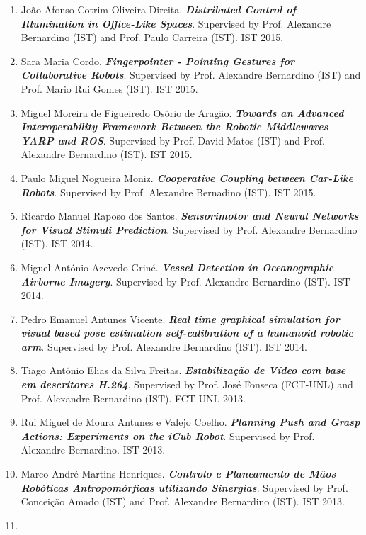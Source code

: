 \documentclass[
]{article}
\begin{document}
\begin{enumerate}
{{  Detection with Multichannel Convolutional Neural Networks}}.
  Supervised by Prof. Jacinto Nascimento (IST) and Prof. Alexandre
  Bernardino (IST). IST 2015.
\item
  João Afonso Cotrim Oliveira Direita. \emph{\textbf{Distributed Control
  of Illumination in Office-Like Spaces}}. Supervised by Prof. Alexandre
  Bernardino (IST) and Prof. Paulo Carreira (IST). IST 2015.
\item
  Sara Maria Cordo. \emph{\textbf{Fingerpointer - Pointing Gestures for
  Collaborative Robots}}. Supervised by Prof. Alexandre Bernardino (IST)
  and Prof. Mario Rui Gomes (IST). IST 2015.
\item
  Miguel Moreira de Figueiredo Osório de Aragão. \emph{\textbf{Towards
  an Advanced Interoperability Framework Between the Robotic Middlewares
  YARP and ROS}}. Supervised by Prof. David Matos (IST) and Prof.
  Alexandre Bernardino (IST). IST 2015.
\item
  Paulo Miguel Nogueira Moniz. \emph{\textbf{Cooperative Coupling
  between Car-Like Robots}}. Supervised by Prof. Alexandre Bernadino
  (IST). IST 2015.
\item
  Ricardo Manuel Raposo dos Santos. \emph{\textbf{Sensorimotor and
  Neural Networks for Visual Stimuli Prediction}}. Supervised by Prof.
  Alexandre Bernardino (IST). IST 2014.
\item
  Miguel António Azevedo Griné. \emph{\textbf{Vessel Detection in
  Oceanographic Airborne Imagery}}. Supervised by Prof. Alexandre
  Bernardino (IST). IST 2014.
\item
  Pedro Emanuel Antunes Vicente. \emph{\textbf{Real time graphical
  simulation for visual based pose estimation self-calibration of a
  humanoid robotic arm}}. Supervised by Prof. Alexandre Bernardino
  (IST). IST 2014.
\item
  Tiago António Elias da Silva Freitas. \emph{\textbf{Estabilização de
  Vídeo com base em descritores H.264}}. Supervised by Prof. José
  Fonseca (FCT-UNL) and Prof. Alexandre Bernardino (IST). FCT-UNL 2013.
\item
  Rui Miguel de Moura Antunes e Valejo Coelho. \emph{\textbf{Planning
  Push and Grasp Actions: Experiments on the iCub Robot}}. Supervised by
  Prof. Alexandre Bernardino. IST 2013.
\item
  Marco André Martins Henriques. \emph{\textbf{Controlo e Planeamento de
  Mãos Robóticas Antropomórficas utilizando Sinergias}}. Supervised by
  Prof. Conceição Amado (IST) and Prof. Alexandre Bernardino (IST). IST
  2013.
\item

\end{enumerate}
\end{document}
